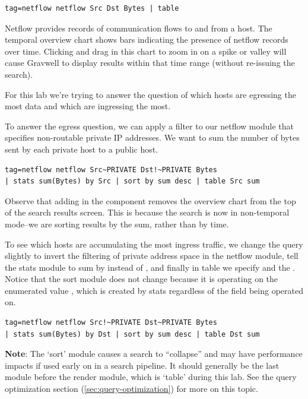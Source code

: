 \begin{Verbatim}[breaklines=true]
tag=netflow netflow Src Dst Bytes | table
\end{Verbatim}

Netflow provides records of communication flows to and from a host. The
temporal overview chart shows bars indicating the presence of netflow
records over time. Clicking and drag in this chart to zoom in on a spike or
valley will cause Gravwell to display results within that time
range (without re-issuing the search).

For this lab we're trying to answer the question of which hosts are
egressing the most data and which are ingressing the most.

To answer the egress question, we can apply a filter to our netflow
module that specifies non-routable private IP addresses. We want to sum
the number of bytes sent by each private host to a public host.

\begin{Verbatim}[breaklines=true]
tag=netflow netflow Src~PRIVATE Dst!~PRIVATE Bytes
| stats sum(Bytes) by Src | sort by sum desc | table Src sum
\end{Verbatim}

Observe that adding in the  component removes the
overview chart from the top of the search results screen. This is
because the search is now in non-temporal mode--we are sorting results by
the sum, rather than by time.

To see which hosts are accumulating the most ingress traffic, we change
the query slightly to invert the filtering of private address space in
the netflow module, tell the stats module to sum by  instead of ,
and finally in table we specify  and the . Notice that the sort
module does not change because it is operating on the enumerated value
, which is created by stats regardless of the field being operated
on.

\begin{Verbatim}[breaklines=true]
tag=netflow netflow Src!~PRIVATE Dst~PRIVATE Bytes
| stats sum(Bytes) by Dst | sort by sum desc | table Dst sum
\end{Verbatim}

\textbf{Note}: The `sort' module causes a search to ``collapse'' and may have
performance impacts if used early on in a search pipeline. It should
generally be the last module before the render module, which is `table'
during this lab. See the query optimization section (\ref{sec:query-optimization}) for more on this topic.


